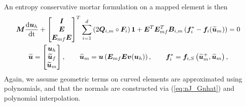 \documentclass{svjour3}                     %
\renewcommand{\tilde}{\widetilde}
\newcommand{\td}[2]{\frac{{\rm d}#1}{{\rm d}{\rm #2}}}
\newcommand{\LRp}[1]{\left( #1 \right)}
\begin{document}
An entropy conservative mortar formulation on a mapped element is then 
\begin{gather}
{\bm{M}}\td{\bm{u}_h}{t} + \begin{bmatrix} \bm{I} \\ \bm{E} \\ \bm{E}_{mf}\bm{E} \end{bmatrix}^T
\sum_{i=1}^d \LRp{2{\bm{Q}}_{i,m} \circ \bm{F}_i}\bm{1} + \bm{E}^T\bm{E}_{mf}^T{\bm{B}}_{i,m}\LRp{\bm{f}_i^*-\bm{f}_i(\tilde{\bm{u}}_m)} = 0 \label{eq:esdgm}\\
\tilde{\bm{u}} = \begin{bmatrix}
\bm{u}_h\\
\tilde{\bm{u}}_f\\
\tilde{\bm{u}}_m
\end{bmatrix}, \qquad \tilde{\bm{u}}_m = \bm{u}\LRp{\bm{E}_{mf}\bm{E}\bm{v}(\bm{u}_h)}, \qquad \bm{f}^*_i = \bm{f}_{i,S}\LRp{\tilde{\bm{u}}_m^+,\tilde{\bm{u}}_m},\nonumber
\end{gather}
Again, we assume geometric terms on curved elements are approximated using polynomials, and that the normals are constructed via (\ref{eq:nJ_Gnhat}) and polynomial interpolation.  
\end{document}
